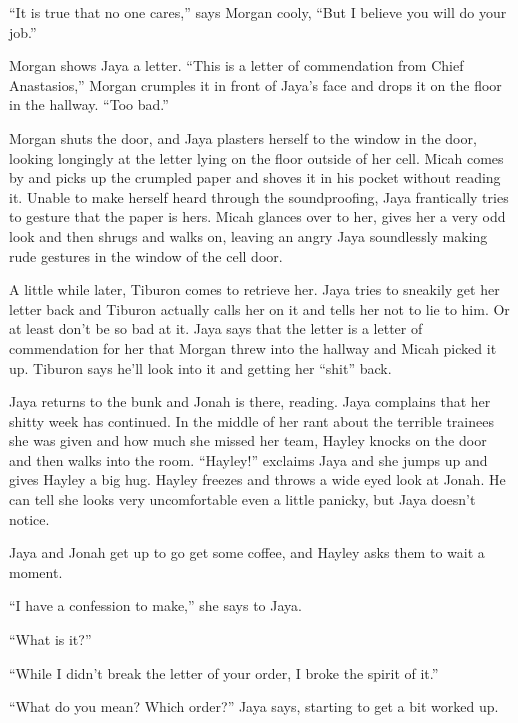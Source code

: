 ``It is true that no one cares,'' says Morgan cooly, ``But I believe you will do your job.''



Morgan shows Jaya a letter.  ``This is a letter of commendation from Chief Anastasios,'' Morgan crumples it in front of Jaya's face and drops it on the floor in the hallway. ``Too bad.''



Morgan shuts the door, and Jaya plasters herself to the window in the door, looking longingly at the letter lying on the floor outside of her cell.  Micah comes by and picks up the crumpled paper and shoves it in his pocket without reading it.  Unable to make herself heard through the soundproofing, Jaya frantically tries to gesture that the paper is hers.  Micah glances over to her, gives her a very odd look and then shrugs and walks on, leaving an angry Jaya soundlessly making rude gestures in the window of the cell door.



A little while later, Tiburon comes to retrieve her.  Jaya tries to sneakily get her letter back and Tiburon actually calls her on it and tells her not to lie to him.  Or at least don't be so bad at it.  Jaya says that the letter is a letter of commendation for her that Morgan threw into the hallway and Micah picked it up.  Tiburon says he'll look into it and getting her ``shit'' back. 



Jaya returns to the bunk and Jonah is there, reading.  Jaya complains that her shitty week has continued.  In the middle of her rant about the terrible trainees she was given and how much she missed her team, Hayley knocks on the door and then walks into the room.  ``Hayley!'' exclaims Jaya and she jumps up and gives Hayley a big hug.  Hayley freezes and throws a wide eyed look at Jonah.  He can tell she looks very uncomfortable even a little panicky, but Jaya doesn't notice.



Jaya and Jonah get up to go get some coffee, and Hayley asks them to wait a moment. 



``I have a confession to make,'' she says to Jaya.

``What is it?'' 

``While I didn't break the letter of your order, I broke the spirit of it.''

``What do you mean?  Which order?'' Jaya says, starting to get a bit worked up.

